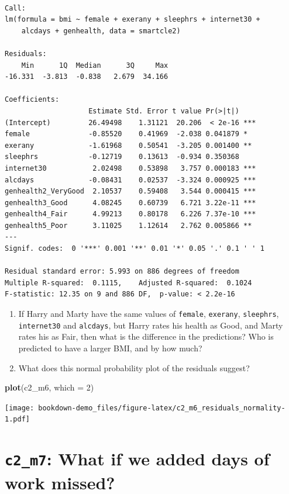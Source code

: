 \documentclass[]{book}
\newenvironment{Shaded}{\begin{snugshade}}{\end{snugshade}}
\newcommand{\KeywordTok}[1]{\textcolor[rgb]{0.13,0.29,0.53}{\textbf{#1}}}
\newcommand{\DataTypeTok}[1]{\textcolor[rgb]{0.13,0.29,0.53}{#1}}
\newcommand{\DecValTok}[1]{\textcolor[rgb]{0.00,0.00,0.81}{#1}}
\newcommand{\NormalTok}[1]{#1}
\theoremstyle{definition}
\theoremstyle{definition}
\theoremstyle{definition}
\theoremstyle{remark}
\begin{document}
\begin{verbatim}

Call:
lm(formula = bmi ~ female + exerany + sleephrs + internet30 + 
    alcdays + genhealth, data = smartcle2)

Residuals:
    Min      1Q  Median      3Q     Max 
-16.331  -3.813  -0.838   2.679  34.166 

Coefficients:
                    Estimate Std. Error t value Pr(>|t|)    
(Intercept)         26.49498    1.31121  20.206  < 2e-16 ***
female              -0.85520    0.41969  -2.038 0.041879 *  
exerany             -1.61968    0.50541  -3.205 0.001400 ** 
sleephrs            -0.12719    0.13613  -0.934 0.350368    
internet30           2.02498    0.53898   3.757 0.000183 ***
alcdays             -0.08431    0.02537  -3.324 0.000925 ***
genhealth2_VeryGood  2.10537    0.59408   3.544 0.000415 ***
genhealth3_Good      4.08245    0.60739   6.721 3.22e-11 ***
genhealth4_Fair      4.99213    0.80178   6.226 7.37e-10 ***
genhealth5_Poor      3.11025    1.12614   2.762 0.005866 ** 
---
Signif. codes:  0 '***' 0.001 '**' 0.01 '*' 0.05 '.' 0.1 ' ' 1

Residual standard error: 5.993 on 886 degrees of freedom
Multiple R-squared:  0.1115,    Adjusted R-squared:  0.1024 
F-statistic: 12.35 on 9 and 886 DF,  p-value: < 2.2e-16
\end{verbatim}

\begin{enumerate}
\def\labelenumi{\arabic{enumi}.}
\item
  If Harry and Marty have the same values of \texttt{female},
  \texttt{exerany}, \texttt{sleephrs}, \texttt{internet30} and
  \texttt{alcdays}, but Harry rates his health as Good, and Marty rates
  his as Fair, then what is the difference in the predictions? Who is
  predicted to have a larger BMI, and by how much?
\item
  What does this normal probability plot of the residuals suggest?
\end{enumerate}

\begin{Shaded}
\begin{Highlighting}[]
\KeywordTok{plot}\NormalTok{(c2_m6, }\DataTypeTok{which =} \DecValTok{2}\NormalTok{)}
\end{Highlighting}
\end{Shaded}

\texttt{[image: bookdown-demo\_files/figure-latex/c2\_m6\_residuals\_normality-1.pdf]}

\section{\texorpdfstring{\texttt{c2\_m7}: What if we added days of work
missed?}{c2\_m7: What if we added days of work missed?}}\label{c2_m7-what-if-we-added-days-of-work-missed}
\end{document}
